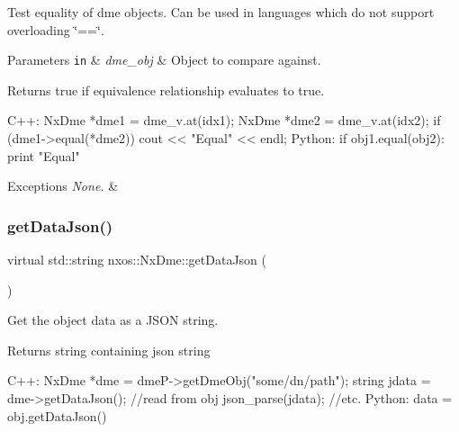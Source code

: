 Test equality of dme objects. Can be used in languages which do not support overloading \char`\"{}==\char`\"{}. 
\begin{DoxyParams}[1]{Parameters}
\mbox{\tt in}  & {\em dme\+\_\+obj} & Object to compare against. \\
\hline
\end{DoxyParams}
\begin{DoxyReturn}{Returns}
true if equivalence relationship evaluates to true.
\end{DoxyReturn}

\begin{DoxyCode}
C++:
     NxDme *dme1 = dme\_v.at(idx1);
     NxDme *dme2 = dme\_v.at(idx2);
     \textcolor{keywordflow}{if} (dme1->equal(*dme2))
         cout << \textcolor{stringliteral}{"Equal"} << endl;
 Python:
     \textcolor{keywordflow}{if} obj1.equal(obj2):
         print \textcolor{stringliteral}{"Equal"}
\end{DoxyCode}



\begin{DoxyExceptions}{Exceptions}
{\em None.} & \\
\hline
\end{DoxyExceptions}
\mbox{\label{classnxos_1_1_nx_dme_a846519c8ee7521dac1c7e6c961903b0f}} 
\subsubsection{\texorpdfstring{get\+Data\+Json()}{getDataJson()}}
{\footnotesize\ttfamily virtual std\+::string nxos\+::\+Nx\+Dme\+::get\+Data\+Json (\begin{DoxyParamCaption}{ }\end{DoxyParamCaption})\hspace{0.3cm}{\ttfamily [pure virtual]}}

Get the object data as a J\+S\+ON string.

\begin{DoxyReturn}{Returns}
string containing json string 
\begin{DoxyCode}
C++:
   NxDme *dme = dmeP->getDmeObj(\textcolor{stringliteral}{"some/dn/path"});
   \textcolor{keywordtype}{string}  jdata = dme->getDataJson(); \textcolor{comment}{//read from obj}
           json\_parse(jdata); \textcolor{comment}{//etc.}
Python:
    data = obj.getDataJson()
\end{DoxyCode}

\end{DoxyReturn}

